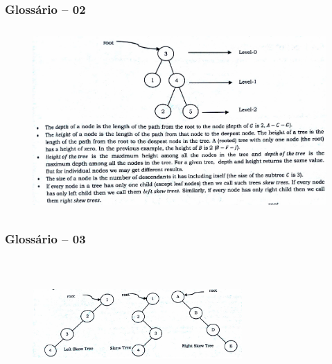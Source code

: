 \begin{frame}

    \frametitle{Glossário -- 02}
    
     \begin{figure}[!ht]
     \centering
    \includegraphics[width=12cm, height=7cm]{figs/fig_arvores/glossario_arv_02.jpg}
    \end{figure}

\end{frame}
\begin{frame}

    \frametitle{Glossário -- 03}
    
     \begin{figure}[!ht]
     \centering
    \includegraphics[width=8cm, height=5cm]{figs/fig_arvores/glossario_arv_03.jpg}
    \end{figure}

\end{frame}

